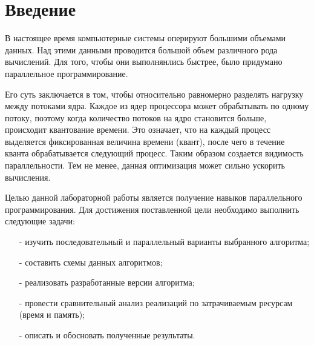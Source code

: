 \chapter*{Введение}

В настоящее время компьютерные системы оперируют большими объемами данных. Над этими данными проводится большой объем различного рода вычислений. Для того, чтобы они выполнянлись быстрее, было придумано параллельное программирование.

Его суть заключается в том, чтобы относительно равномерно разделять нагрузку между потоками ядра. Каждое из ядер процессора может обрабатывать по одному потоку, поэтому когда количество потоков на ядро становится больше, происходит квантование времени. Это означает, что на каждый процесс выделяется фиксированная величина времени (квант), после чего в течение кванта обрабатывается следующий процесс. Таким образом создается видимость параллельности. Тем не менее, данная оптимизация может сильно ускорить вычисления. 

Целью данной лабораторной работы является получение навыков параллельного программирования. Для достижения поставленной цели необходимо выполнить следующие задачи:
\begin{itemize}
	\item[-] изучить последовательный и параллельный варианты выбранного алгоритма;
	\item[-] составить схемы данных алгоритмов;
	\item[-] реализовать разработанные версии алгоритма;
	\item[-] провести сравнительный анализ реализаций по затрачиваемым ресурсам (время и память);
	\item[-] описать и обосновать полученные результаты.
\end{itemize}